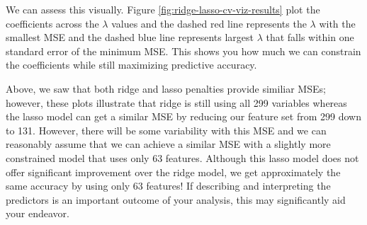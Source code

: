 \documentclass[]{book}
\theoremstyle{definition}
\theoremstyle{definition}
\theoremstyle{definition}
\theoremstyle{remark}
\begin{document}
We can assess this visually. Figure \ref{fig:ridge-lasso-cv-viz-results}
plot the coefficients across the \(\lambda\) values and the dashed red
line represents the \(\lambda\) with the smallest MSE and the dashed
blue line represents largest \(\lambda\) that falls within one standard
error of the minimum MSE. This shows you how much we can constrain the
coefficients while still maximizing predictive accuracy.

\begin{tip}
Above, we saw that both ridge and lasso penalties provide similiar MSEs;
however, these plots illustrate that ridge is still using all 299
variables whereas the lasso model can get a similar MSE by reducing our
feature set from 299 down to 131. However, there will be some
variability with this MSE and we can reasonably assume that we can
achieve a similar MSE with a slightly more constrained model that uses
only 63 features. Although this lasso model does not offer significant
improvement over the ridge model, we get approximately the same accuracy
by using only 63 features! If describing and interpreting the predictors
is an important outcome of your analysis, this may significantly aid
your endeavor.
\end{tip}
\end{document}
